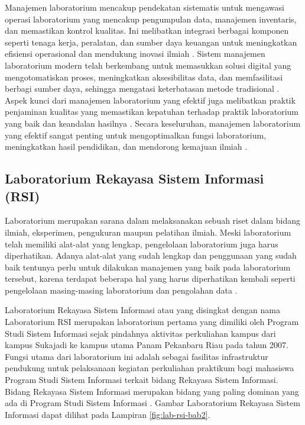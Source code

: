 Manajemen laboratorium mencakup pendekatan sistematis untuk mengawasi operasi laboratorium yang mencakup pengumpulan data, manajemen inventaris, dan memastikan kontrol kualitas. Ini melibatkan integrasi berbagai komponen seperti tenaga kerja, peralatan, dan sumber daya keuangan untuk meningkatkan efisiensi operasional dan mendukung inovasi ilmiah \cite{marwah2024sistem}. Sistem manajemen laboratorium modern telah berkembang untuk memasukkan solusi digital yang mengotomatiskan proses, meningkatkan aksesibilitas data, dan memfasilitasi berbagi sumber daya, sehingga mengatasi keterbatasan metode tradisional \cite{rihm2024digital}. Aspek kunci dari manajemen laboratorium yang efektif juga melibatkan praktik penjaminan kualitas yang memastikan kepatuhan terhadap praktik laboratorium yang baik dan keandalan hasilnya \cite{kawai2021phase}. Secara keseluruhan, manajemen laboratorium yang efektif sangat penting untuk mengoptimalkan fungsi laboratorium, meningkatkan hasil pendidikan, dan mendorong kemajuan ilmiah \cite{marwah2024sistem}.

\subsection{Laboratorium Rekayasa Sistem Informasi (RSI)}
Laboratorium merupakan sarana dalam melaksanakan sebuah riset dalam bidang ilmiah, eksperimen, pengukuran maupun pelatihan ilmiah. Meski laboratorium telah memiliki alat-alat yang lengkap, pengelolaan laboratorium juga harus diperhatikan. Adanya alat-alat yang sudah lengkap dan penggunaan yang sudah baik tentunya perlu untuk dilakukan manajemen yang baik pada laboratorium tersebut, karena terdapat beberapa hal yang harus diperhatikan kembali seperti pengelolaan masing-masing laboratorium dan pengolahan data \cite{sweden2022rancang}.

Laboratorium Rekayasa Sistem Informasi atau yang disingkat dengan nama Laboratorium RSI merupakan laboratorium pertama yang dimiliki oleh Program Studi Sistem Informasi sejak pindahnya aktivitas perkuliahan kampus dari kampus Sukajadi ke kampus utama Panam Pekanbaru Riau pada tahun 2007. Fungsi utama dari laboratorium ini adalah sebagai fasilitas infrastruktur pendukung untuk pelaksanaan kegiatan perkuliahan praktikum bagi mahasiswa Program Studi Sistem Informasi terkait bidang Rekayasa Sistem Informasi. Bidang Rekayasa Sistem Informasi merupakan bidang yang paling dominan yang ada di Program Studi Sistem Informasi \cite{labsi2023}. Gambar Laboratorium Rekayasa Sistem Informasi dapat dilihat pada Lampiran \ref{fig:lab-rsi-bab2}.

